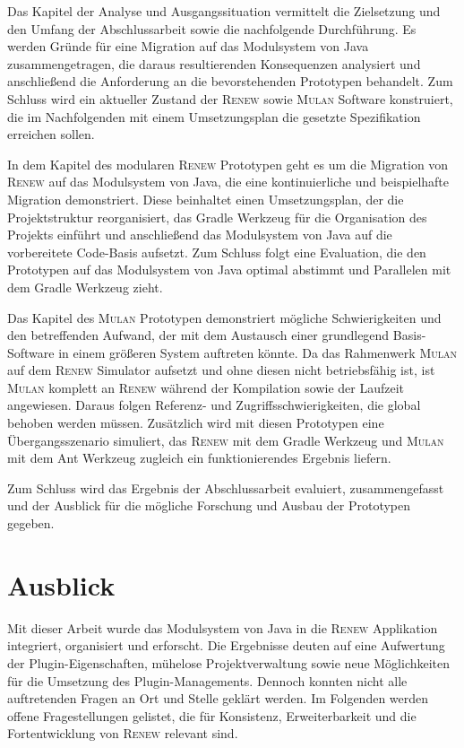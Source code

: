 Das Kapitel der Analyse und Ausgangssituation vermittelt die Zielsetzung und den Umfang der Abschlussarbeit sowie die nachfolgende Durchführung. Es werden Gründe für eine Migration auf das Modulsystem von Java zusammengetragen, die daraus resultierenden Konsequenzen analysiert und anschließend die Anforderung an die bevorstehenden Prototypen behandelt. Zum Schluss wird ein aktueller Zustand der \textsc{Renew} sowie \textsc{Mulan} Software konstruiert, die im Nachfolgenden mit einem Umsetzungsplan die gesetzte Spezifikation erreichen sollen.\bigbreak

In dem Kapitel des modularen \textsc{Renew} Prototypen geht es um die Migration von \textsc{Renew} auf das Modulsystem von Java, die eine kontinuierliche und beispielhafte Migration demonstriert. Diese beinhaltet einen Umsetzungsplan, der die Projektstruktur reorganisiert, das Gradle Werkzeug für die Organisation des Projekts einführt und anschließend das Modulsystem von Java auf die vorbereitete Code-Basis aufsetzt. Zum Schluss folgt eine Evaluation, die den Prototypen auf das Modulsystem von Java optimal abstimmt und Parallelen mit dem Gradle Werkzeug zieht.\bigbreak

Das Kapitel des \textsc{Mulan} Prototypen demonstriert mögliche Schwierigkeiten und den betreffenden Aufwand, der mit dem Austausch einer grundlegend Basis-Software in einem größeren System auftreten könnte. Da das Rahmenwerk \textsc{Mulan} auf dem \textsc{Renew} Simulator aufsetzt und ohne diesen nicht betriebsfähig ist, ist \textsc{Mulan} komplett an \textsc{Renew} während der Kompilation sowie der Laufzeit angewiesen. Daraus folgen Referenz- und Zugriffsschwierigkeiten, die global behoben werden müssen. Zusätzlich wird mit diesen Prototypen eine Übergangsszenario simuliert, das \textsc{Renew} mit dem Gradle Werkzeug und \textsc{Mulan} mit dem Ant Werkzeug zugleich ein funktionierendes Ergebnis liefern. \bigbreak

Zum Schluss wird das Ergebnis der Abschlussarbeit evaluiert, zusammengefasst und der Ausblick für die mögliche Forschung und Ausbau der Prototypen gegeben. 


\section{Ausblick} 
	Mit dieser Arbeit wurde das Modulsystem von Java in die \textsc{Renew} Applikation integriert, organisiert und erforscht. Die Ergebnisse deuten auf eine Aufwertung der Plugin-Eigenschaften, mühelose Projektverwaltung sowie neue Möglichkeiten für die Umsetzung des Plugin-Managements. Dennoch konnten nicht alle auftretenden Fragen an Ort und Stelle geklärt werden.\bigbreak
	Im Folgenden werden offene Fragestellungen gelistet, die für Konsistenz, Erweiterbarkeit und die Fortentwicklung von \textsc{Renew} relevant sind. 
	
